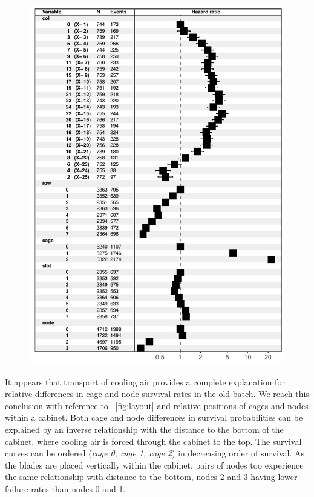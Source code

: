 \begin{figure}[bt]
  \centering
  \includegraphics[width=\columnwidth]{figs/cox_o_t001.pdf}
  \caption{}
  \label{fig:cox-torus}
\end{figure}

It appears that transport of cooling air provides a complete
explanation for relative differences in cage and node survival rates
in the old batch.  We reach this conclusion with reference to
~\ref{fig:layout} and relative positions of cages and nodes
within a cabinet. Both cage and node differences in survival
probabilities can be explained by an inverse relationship with the
distance to the bottom of the cabinet, where cooling air is forced
through the cabinet to the top. The survival curves can be ordered
({\em cage 0, cage 1, cage 2}) in decreasing order of survival. As the
blades are placed vertically within the cabinet, pairs of nodes too
experience the same relationship with distance to the bottom, nodes 2
and 3 having lower failure rates than nodes 0 and 1. 

